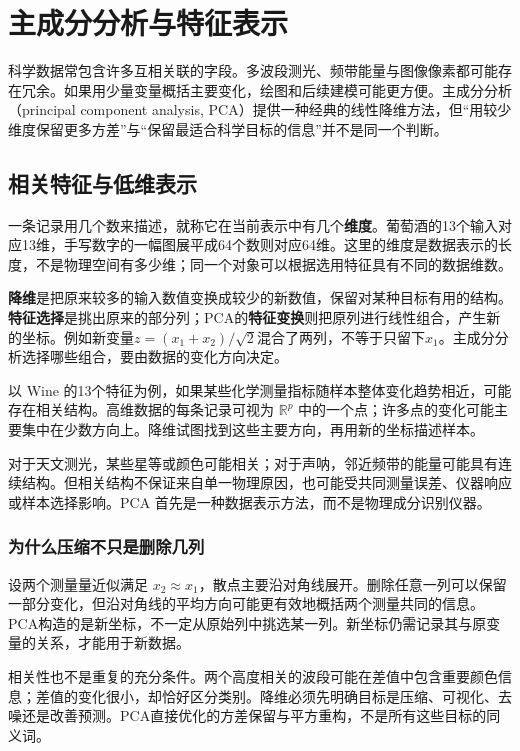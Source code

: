 \chapter{主成分分析与特征表示}

科学数据常包含许多互相关联的字段。多波段测光、频带能量与图像像素都可能存在冗余。如果用少量变量概括主要变化，绘图和后续建模可能更方便。主成分分析（principal component analysis, PCA）提供一种经典的线性降维方法，但“用较少维度保留更多方差”与“保留最适合科学目标的信息”并不是同一个判断。
\section{相关特征与低维表示}

一条记录用几个数来描述，就称它在当前表示中有几个\textbf{维度}。葡萄酒的13个输入对应13维，手写数字的一幅图展平成64个数则对应64维。这里的维度是数据表示的长度，不是物理空间有多少维；同一个对象可以根据选用特征具有不同的数据维数。

\textbf{降维}是把原来较多的输入数值变换成较少的新数值，保留对某种目标有用的结构。\textbf{特征选择}是挑出原来的部分列；PCA的\textbf{特征变换}则把原列进行线性组合，产生新的坐标。例如新变量$z=(x_1+x_2)/\sqrt2$混合了两列，不等于只留下$x_1$。主成分分析选择哪些组合，要由数据的变化方向决定。

以 Wine 的13个特征为例，如果某些化学测量指标随样本整体变化趋势相近，可能存在相关结构。高维数据的每条记录可视为 $\mathbb R^p$ 中的一个点；许多点的变化可能主要集中在少数方向上。降维试图找到这些主要方向，再用新的坐标描述样本。

对于天文测光，某些星等或颜色可能相关；对于声呐，邻近频带的能量可能具有连续结构。但相关结构不保证来自单一物理原因，也可能受共同测量误差、仪器响应或样本选择影响。PCA 首先是一种数据表示方法，而不是物理成分识别仪器。

\subsection{为什么压缩不只是删除几列}
设两个测量量近似满足 $x_2\approx x_1$，散点主要沿对角线展开。删除任意一列可以保留一部分变化，但沿对角线的平均方向可能更有效地概括两个测量共同的信息。PCA构造的是新坐标，不一定从原始列中挑选某一列。新坐标仍需记录其与原变量的关系，才能用于新数据。

相关性也不是重复的充分条件。两个高度相关的波段可能在差值中包含重要颜色信息；差值的变化很小，却恰好区分类别。降维必须先明确目标是压缩、可视化、去噪还是改善预测。PCA直接优化的方差保留与平方重构，不是所有这些目标的同义词。


